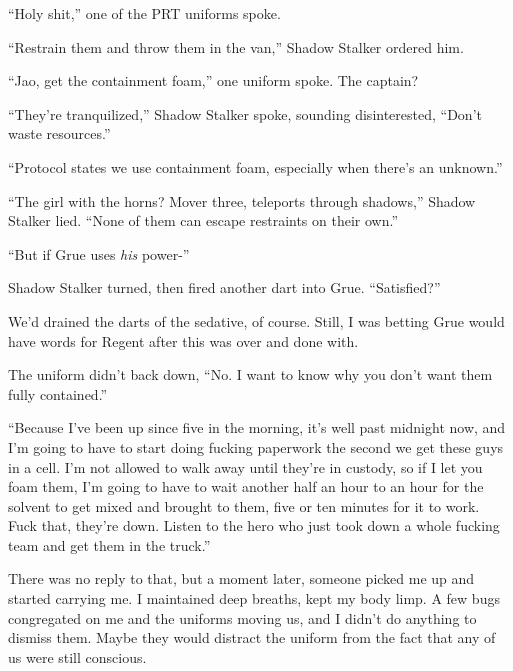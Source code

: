 ``Holy shit,'' one of the PRT uniforms spoke.



``Restrain them and throw them in the van,'' Shadow Stalker ordered him.



``Jao, get the containment foam,'' one uniform spoke.  The captain?



``They're tranquilized,'' Shadow Stalker spoke, sounding disinterested, ``Don't waste resources.''



``Protocol states we use containment foam, especially when there's an unknown.''



``The girl with the horns?  Mover three, teleports through shadows,'' Shadow Stalker lied.  ``None of them can escape restraints on their own.''



``But if Grue uses \emph{his} power-''



Shadow Stalker turned, then fired another dart into Grue.  ``Satisfied?''



We'd drained the darts of the sedative, of course.  Still, I was betting Grue would have words for Regent after this was over and done with.



The uniform didn't back down, ``No.  I want to know why you don't want them fully contained.''



``Because I've been up since five in the morning, it's well past midnight now, and I'm going to have to start doing fucking paperwork the second we get these guys in a cell.  I'm not allowed to walk away until they're in custody, so if I let you foam them, I'm going to have to wait another half an hour to an hour for the solvent to get mixed and brought to them, five or ten minutes for it to work.  Fuck that, they're down.  Listen to the hero who just took down a whole fucking team and get them in the truck.''



There was no reply to that, but a moment later, someone picked me up and started carrying me.  I maintained deep breaths, kept my body limp.  A few bugs congregated on me and the uniforms moving us, and I didn't do anything to dismiss them.  Maybe they would distract the uniform from the fact that any of us were still conscious.



